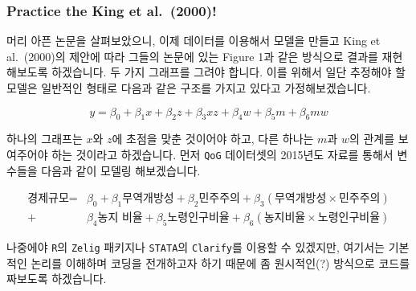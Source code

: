 \documentclass[
]{book}
\newenvironment{Shaded}{\begin{snugshade}}{\end{snugshade}}
\newcommand{\DataTypeTok}[1]{\textcolor[rgb]{0.13,0.29,0.53}{#1}}
\newcommand{\DecValTok}[1]{\textcolor[rgb]{0.00,0.00,0.81}{#1}}
\newcommand{\KeywordTok}[1]{\textcolor[rgb]{0.13,0.29,0.53}{\textbf{#1}}}
\newcommand{\NormalTok}[1]{#1}
\newcommand{\OperatorTok}[1]{\textcolor[rgb]{0.81,0.36,0.00}{\textbf{#1}}}
\newcommand{\StringTok}[1]{\textcolor[rgb]{0.31,0.60,0.02}{#1}}
\begin{document}
\hypertarget{practice-the-king-et-al.-2000}{%
\subsubsection{Practice the King et al.~(2000)!}\label{practice-the-king-et-al.-2000}}

머리 아픈 논문을 살펴보았으니, 이제 데이터를 이용해서 모델을 만들고 King et al.~(2000)의 제안에 따라 그들의 논문에 있는 Figure 1과 같은 방식으로 결과를 재현해보도록 하겠습니다. 두 가지 그래프를 그려야 합니다. 이를 위해서 일단 추정해야 할 모델은 일반적인 형태로 다음과 같은 구조를 가지고 있다고 가정해보겠습니다.

\[
y = \beta_0 + \beta_1x + \beta_2z + \beta_3xz + \beta_4w + \beta_5m + \beta_6mw
\]

하나의 그래프는 \(x\)와 \(z\)에 초점을 맞춘 것이어야 하고, 다른 하나는 \(m\)과 \(w\)의 관계를 보여주어야 하는 것이라고 하겠습니다. 먼저 \texttt{QoG} 데이터셋의 2015년도 자료를 통해서 변수들을 다음과 같이 모델링 해보겠습니다.

\[
\begin{aligned}
\text{경제규모} =&\beta_0 + \beta_1\text{무역개방성} + \beta_2\text{민주주의} + \beta_3(\text{무역개방성}\times\text{민주주의})\\
+&\beta_4\text{농지 비율} + \beta_5\text{노령인구비율} +\beta_6(\text{농지비율}\times\text{노령인구비율})
\end{aligned}
\]

나중에야 \texttt{R}의 \texttt{Zelig} 패키지나 \texttt{STATA}의 \texttt{Clarify}를 이용할 수 있겠지만, 여기서는 기본적인 논리를 이해하며 코딩을 전개하고자 하기 때문에 좀 원시적인(?) 방식으로 코드를 짜보도록 하겠습니다.

\begin{Shaded}
\end{Shaded}
\end{document}
